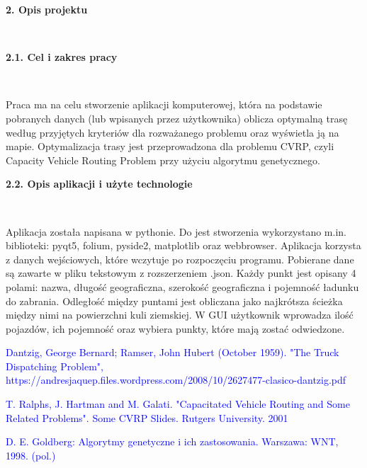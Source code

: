 \documentclass[a4paper, twoside, 12pt, justified]{article}
\begin{document}
	
	
	\newpage
	\begin{large}\textbf{2. Opis projektu}\end{large}\\
	\vspace{5mm} %
	
	\begin{large}\textbf{2.1. Cel i zakres pracy}\end{large}\\
	\vspace{10mm} %
	
	\hspace{5mm}Praca ma na celu stworzenie
	 aplikacji komputerowej, która na podstawie pobranych danych (lub wpisanych przez użytkownika) oblicza optymalną trasę według przyjętych kryteriów dla rozważanego problemu oraz wyświetla ją na mapie. Optymalizacja trasy jest przeprowadzona dla problemu CVRP, czyli Capacity Vehicle Routing Problem przy użyciu algorytmu genetycznego. 
	 \vspace{10mm}
	 
	 \begin{large}\textbf{2.2. Opis aplikacji i użyte technologie}\end{large}\\
	 \vspace{10mm} %
	 
	 Aplikacja została napisana w pythonie. Do jest stworzenia wykorzystano m.in. biblioteki: pyqt5, folium, pyside2, matplotlib oraz webbrowser. Aplikacja korzysta z danych wejściowych, które wczytuje po rozpoczęciu programu. Pobierane dane są zawarte w pliku tekstowym z rozszerzeniem .json. Każdy punkt jest opisany 4 polami: nazwa, długość geograficzna, szerokość geograficzna i pojemność ładunku do zabrania. Odległość między puntami jest obliczana jako najkrótsza ścieżka między nimi na powierzchni kuli ziemskiej. W GUI użytkownik wprowadza ilość pojazdów, ich pojemność oraz wybiera punkty, które mają zostać odwiedzone.
	
	
	
	\newpage
	\renewcommand\refname{Źródła}
	\begin{thebibliography}{}
		{\hypertarget{vrp}{\textcolor{blue}{
		 Dantzig, George Bernard; Ramser, John Hubert (October 1959). "The Truck Dispatching Problem", https://andresjaquep.files.wordpress.com/2008/10/2627477-clasico-dantzig.pdf}}}
		
		{\hypertarget{cvrp}{\textcolor{blue}{T. Ralphs, J. Hartman and M. Galati. "Capacitated Vehicle Routing and Some Related Problems". Some CVRP Slides. Rutgers University. 2001}}}
		
		{\hypertarget{ag}{\textcolor{blue}{
		D. E. Goldberg: Algorytmy genetyczne i ich zastosowania. Warszawa: WNT, 1998. (pol.)}}}
		
	\end{thebibliography}
	
	
	
\end{document}
